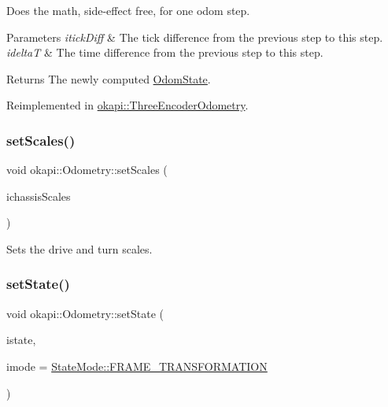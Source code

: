 Does the math, side-\/effect free, for one odom step.


\begin{DoxyParams}{Parameters}
{\em itick\+Diff} & The tick difference from the previous step to this step. \\
\hline
{\em ideltaT} & The time difference from the previous step to this step. \\
\hline
\end{DoxyParams}
\begin{DoxyReturn}{Returns}
The newly computed \mbox{\hyperlink{structokapi_1_1OdomState}{Odom\+State}}. 
\end{DoxyReturn}


Reimplemented in \mbox{\hyperlink{classokapi_1_1ThreeEncoderOdometry_a8c0811674b9da0623a3cece56a25cca6}{okapi\+::\+Three\+Encoder\+Odometry}}.

\mbox{\label{classokapi_1_1Odometry_a5330b093e51d650b8ff2c6fe0ec2d27e}} 
\subsubsection{\texorpdfstring{setScales()}{setScales()}}
{\footnotesize\ttfamily void okapi\+::\+Odometry\+::set\+Scales (\begin{DoxyParamCaption}\item[{const \mbox{\hyperlink{classokapi_1_1ChassisScales}{Chassis\+Scales}} \&}]{ichassis\+Scales }\end{DoxyParamCaption})\hspace{0.3cm}{\ttfamily [virtual]}}

Sets the drive and turn scales. \mbox{\label{classokapi_1_1Odometry_a0f18a0770477130307b7c6a9702b0cc6}} 
\subsubsection{\texorpdfstring{setState()}{setState()}}
{\footnotesize\ttfamily void okapi\+::\+Odometry\+::set\+State (\begin{DoxyParamCaption}\item[{const \mbox{\hyperlink{structokapi_1_1OdomState}{Odom\+State}} \&}]{istate,  }\item[{const \mbox{\hyperlink{namespaceokapi_af37fbd761bd859a00ff4dd4a87dd8c07}{State\+Mode}} \&}]{imode = {\ttfamily \mbox{\hyperlink{namespaceokapi_af37fbd761bd859a00ff4dd4a87dd8c07ad5ed7666e5cebf60d3af20a5a46edf3b}{State\+Mode\+::\+F\+R\+A\+M\+E\+\_\+\+T\+R\+A\+N\+S\+F\+O\+R\+M\+A\+T\+I\+ON}}} }\end{DoxyParamCaption})\hspace{0.3cm}{\ttfamily [virtual]}}


